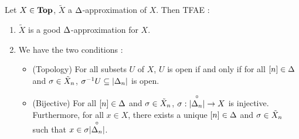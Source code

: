 \documentclass{article}
\begin{document}
\begin{lem}
  
  Let $X \in \mathbf{Top}$, $\tilde{X}$ a $\Delta$-approximation of $X$.
  Then TFAE :
  \begin{enumerate}
    \item $\tilde{X}$ is a good $\Delta$-approximation for $X$.
    \item We have the two conditions : 
    \begin{itemize}
      \item (Topology) For all subsets $U$ of $X$,
      $U$ is open if and only if for all $[n] \in \Delta$ and 
      $\sigma \in \tilde{X}_n$, $\sigma^{-1} U \subseteq \left\vert \Delta_n \right\vert$ is open.
      \item (Bijective) For all $[n] \in \Delta$ and $\sigma \in \tilde{X}_n$, 
      $\sigma : \overset{\circ}{\left\vert \Delta_n \right\vert} \to X$ is injective. 
      Furthermore, 
      for all $x \in X$, 
      there exists a unique $[n] \in \Delta$ and $\sigma \in \tilde{X}_n$ such that 
      $x \in \sigma \overset{\circ}{\left\vert \Delta_n \right\vert}$.
    \end{itemize}
  \end{enumerate}
\end{lem}
\end{document}
